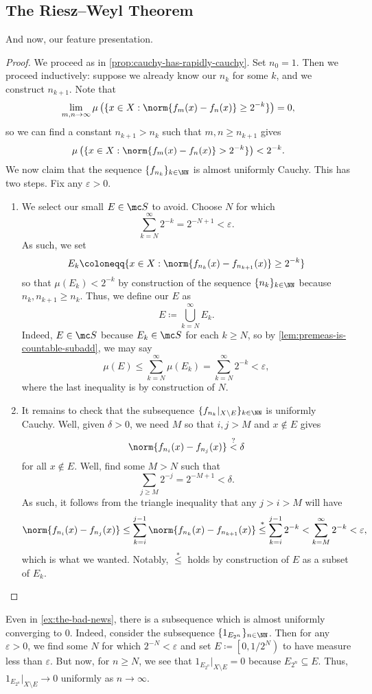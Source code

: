 \documentclass[../notes.tex]{subfiles}
\begin{document}
\subsection{The Riesz--Weyl Theorem}
And now, our feature presentation.
\rwthm*
\begin{proof}
	We proceed as in \autoref{prop:cauchy-has-rapidly-cauchy}. Set $n_0=1$. Then we proceed inductively: suppose we already know our $n_k$ for some $k$, and we construct $n_{k+1}$. Note that
	\[\lim_{m,n\to\infty}\mu\left(\{x\in X:\norm{f_m(x)-f_n(x)}\ge2^{-k}\}\right)=0,\]
	so we can find a constant $n_{k+1}>n_k$ such that $m,n\ge n_{k+1}$ gives
	\[\mu\left(\{x\in X:\norm{f_m(x)-f_n(x)}>2^{-k}\}\right)<2^{-k}.\]
	We now claim that the sequence $\{f_{n_k}\}_{k\in\NN}$ is almost uniformly Cauchy. This has two steps. Fix any $\varepsilon>0$.
	\begin{enumerate}
		\item We select our small $E\in\mc S$ to avoid. Choose $N$ for which
		\[\sum_{k=N}^\infty 2^{-k}=2^{-N+1}<\varepsilon.\]
		As such, we set
		\[E_k\coloneqq\{x\in X:\norm{f_{n_k}(x)-f_{n_{k+1}}(x)}\ge2^{-k}\}\]
		so that $\mu(E_k)<2^{-k}$ by construction of the sequence $\{n_k\}_{k\in\NN}$ because $n_k,n_{k+1}\ge n_k$. Thus, we define our $E$ as
		\[E\coloneqq\bigcup_{k=N}^\infty E_k.\]
		Indeed, $E\in\mc S$ because $E_k\in\mc S$ for each $k\ge N$, so by \autoref{lem:premeas-is-countable-subadd}, we may say
		\[\mu(E)\le\sum_{k=N}^\infty\mu(E_k)=\sum_{k=N}^\infty2^{-k}<\varepsilon,\]
		where the last inequality is by construction of $N$.
		\item It remains to check that the subsequence $\{f_{n_k}|_{X\setminus E}\}_{k\in\NN}$ is uniformly Cauchy. Well, given $\delta>0$, we need $M$ so that $i,j>M$ and $x\notin E$ gives
		\[\norm{f_{n_i}(x)-f_{n_j}(x)}\stackrel?<\delta\]
		for all $x\notin E$. Well, find some $M>N$ such that
		\[\sum_{j\ge M}2^{-j}=2^{-M+1}<\delta.\]
		As such, it follows from the triangle inequality that any $j>i>M$ will have
		\[\norm{f_{n_i}(x)-f_{n_j}(x)}\le\sum_{k=i}^{j-1}\norm{f_{n_k}(x)-f_{n_{k+1}}(x)}\stackrel*\le\sum_{k=i}^{j-1}2^{-k}<\sum_{k=M}^\infty2^{-k}<\varepsilon,\]
		which is what we wanted. Notably, $\stackrel*\le$ holds by construction of $E$ as a subset of $E_k$.
		\qedhere
	\end{enumerate}
\end{proof}
\begin{example}
	Even in \autoref{ex:the-bad-news}, there is a subsequence which is almost uniformly converging to $0$. Indeed, consider the subsequence $\{1_{E_{2^n}}\}_{n\in\NN}$. Then for any $\varepsilon>0$, we find some $N$ for which $2^{-N}<\varepsilon$ and set $E\coloneqq\left[0,1/2^N\right)$ to have measure less than $\varepsilon$. But now, for $n\ge N$, we see that $1_{E_{2^n}}|_{X\setminus E}=0$ because $E_{2^n}\subseteq E$. Thus, $1_{E_{2^n}}|_{X\setminus E}\to 0$ uniformly as $n\to\infty$.
\end{example}
\end{document}
